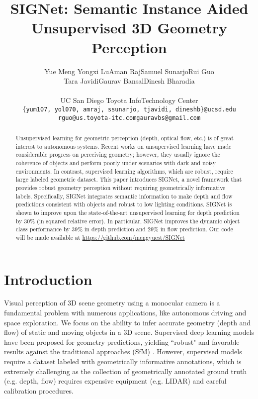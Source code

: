 \documentclass[10pt,twocolumn]{article}
\newcommand{\ngap}{\quad\quad}
\newcommand{\name}{SIGNet\xspace}
\begin{document}
\title{\name: Semantic Instance Aided Unsupervised 3D Geometry Perception}

\author{Yue Meng \ngap Yongxi Lu\ngap Aman Raj\ngap Samuel Sunarjo\ngap Rui Guo\\Tara Javidi\ngap Gaurav Bansal\ngap Dinesh Bharadia\\ \\
UC San Diego \ngap Toyota InfoTechnology Center\\
{\tt\small \{yum107, yol070, amraj, ssunarjo, tjavidi, dineshb\}@ucsd.edu} \\ 
{\tt\small rguo@us.toyota-itc.com\ngap gauravbs@gmail.com}}

\maketitle
\thispagestyle{empty}
\begin{abstract}
Unsupervised learning for geometric perception (depth, optical flow, etc.) is of great interest to autonomous systems. Recent works on unsupervised learning have made considerable progress on perceiving geometry; however, they usually ignore the coherence of objects and perform poorly under scenarios with dark and noisy environments. In contrast, supervised learning algorithms, which are robust, require large labeled geometric dataset. This paper introduces SIGNet, a novel framework that provides robust geometry perception without requiring  geometrically informative labels. Specifically, SIGNet integrates semantic information to make depth and flow predictions consistent with objects and robust to low lighting conditions. SIGNet is shown to improve upon the state-of-the-art unsupervised learning for depth prediction by 30\% (in squared relative error). In particular, SIGNet improves the dynamic object class performance by 39\% in depth prediction and 29\% in flow prediction. Our code will be made available at \url{https://github.com/mengyuest/SIGNet}
\end{abstract}

\section{Introduction}
\label{sec:intro}

Visual perception of 3D scene geometry using a monocular camera is a fundamental problem with numerous applications, like autonomous driving and space exploration. We focus on the ability to infer accurate geometry (depth and flow) of static and moving objects in a 3D scene. Supervised deep learning models have been proposed for geometry predictions, yielding ``robust" and favorable results against the traditional approaches (SfM) \cite{saxena2006learning,saxena2009make3d,fischer2015flownet,byravan2017se3,bloesch2018codeslam,lianos2018vso}. However, supervised models require a dataset labeled with geometrically informative annotations, which is extremely challenging as the collection of geometrically annotated ground truth (e.g. depth, flow) requires expensive equipment (e.g. LIDAR) and careful calibration procedures. 
\end{document}
